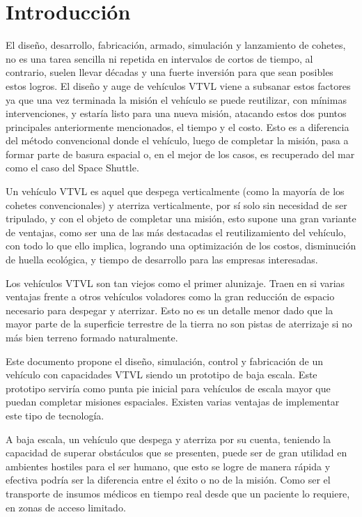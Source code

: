 
\section{Introducción}
El diseño, desarrollo, fabricación, armado, simulación y lanzamiento de cohetes, no es una tarea
sencilla ni repetida en intervalos de cortos de tiempo, al contrario, suelen llevar décadas y una
fuerte inversión para que sean posibles estos logros. El diseño y auge de vehículos VTVL viene
a subsanar estos factores ya que una vez terminada la misión el vehículo se puede reutilizar,
con mínimas intervenciones, y estaría listo para una nueva misión, atacando estos dos puntos principales anteriormente mencionados, el tiempo y el costo. Esto es a diferencia del método convencional donde el vehículo, luego de completar la misión, pasa a formar parte de basura espacial o, en el mejor de los casos, es recuperado del mar como el caso del Space Shuttle. 

\medskip

Un vehículo VTVL es aquel que despega verticalmente (como la mayoría de los cohetes
convencionales) y aterriza verticalmente, por sí solo sin necesidad de ser tripulado, y con el
objeto de completar una misión, esto supone una gran variante de ventajas, como ser una de
las más destacadas el reutilizamiento del vehículo, con todo lo que ello implica, logrando una
optimización de los costos, disminución de huella ecológica, y tiempo de desarrollo para las empresas interesadas. %

\medskip

Los vehículos VTVL son tan viejos como el primer alunizaje. Traen en si varias ventajas frente a otros vehículos voladores como la gran reducción de espacio necesario para despegar y aterrizar. Esto no es un detalle menor dado que la mayor parte de la superficie terrestre de la tierra no son pistas de aterrizaje si no más bien terreno formado naturalmente.

\medskip

Este documento propone el diseño, simulación, control y fabricación de un vehículo con capacidades VTVL siendo un prototipo de baja escala. 
Este prototipo serviría como punta pie inicial
para vehículos de escala mayor que puedan completar misiones espaciales. Existen varias ventajas de implementar este tipo de tecnología.

\medskip

A baja escala, un vehículo que despega y aterriza por su cuenta, teniendo la capacidad de
superar obstáculos que se presenten, puede ser de gran utilidad en ambientes hostiles para el
ser humano, que esto se logre de manera rápida y efectiva podría ser la diferencia entre el
éxito o no de la misión.
Como ser el transporte de insumos médicos en tiempo real desde que un paciente lo requiere,
en zonas de acceso limitado.

